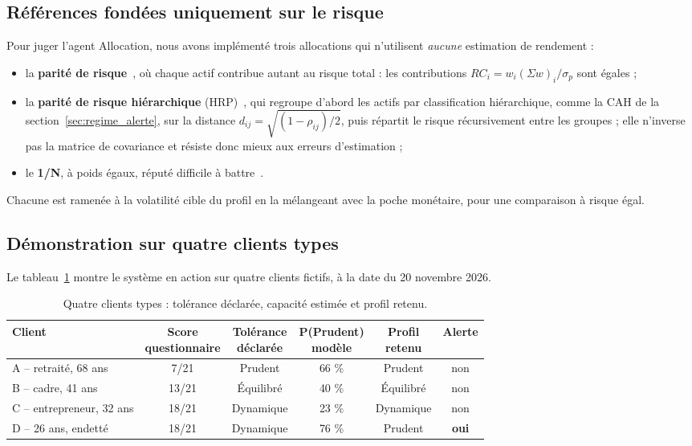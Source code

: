 \subsection{Références fondées uniquement sur le risque}

Pour juger l'agent Allocation, nous avons implémenté trois allocations qui n'utilisent \emph{aucune} estimation de rendement :
\begin{itemize}
  \item la \textbf{parité de risque}~\cite{maillard2010}, où chaque actif contribue autant au risque total : les contributions $RC_i = w_i(\Sigma w)_i/\sigma_p$ sont égales ;
  \item la \textbf{parité de risque hiérarchique} (HRP)~\cite{lopezdeprado2016}, qui regroupe d'abord les actifs par classification hiérarchique, comme la CAH de la section~\ref{sec:regime_alerte}, sur la distance $d_{ij} = \sqrt{(1-\rho_{ij})/2}$, puis répartit le risque récursivement entre les groupes ; elle n'inverse pas la matrice de covariance et résiste donc mieux aux erreurs d'estimation ;
  \item le \textbf{1/N}, à poids égaux, réputé difficile à battre~\cite{demiguel2009}.
\end{itemize}
Chacune est ramenée à la volatilité cible du profil en la mélangeant avec la poche monétaire, pour une comparaison à risque égal.

\subsection{Démonstration sur quatre clients types}

Le tableau~\ref{tab:clients} montre le système en action sur quatre clients fictifs, à la date du 20 novembre 2026.

\begin{table}[!htb]
  \centering
  \small
  \caption{Quatre clients types : tolérance déclarée, capacité estimée et profil retenu.}
  \label{tab:clients}
  \begin{tabular}{@{}l c c c c c@{}}
    \toprule
    \textbf{Client} & \shortstack{\textbf{Score}\\\textbf{questionnaire}} & \shortstack{\textbf{Tolérance}\\\textbf{déclarée}} & \shortstack{\textbf{P(Prudent)}\\\textbf{modèle}} & \shortstack{\textbf{Profil}\\\textbf{retenu}} & \textbf{Alerte} \\
    \midrule
    A -- retraité, 68 ans & 7/21 & Prudent & 66 \% & Prudent & non \\
    B -- cadre, 41 ans & 13/21 & Équilibré & 40 \% & Équilibré & non \\
    C -- entrepreneur, 32 ans & 18/21 & Dynamique & 23 \% & Dynamique & non \\
    D -- 26 ans, endetté & 18/21 & Dynamique & 76 \% & Prudent & \textbf{oui} \\
    \bottomrule
  \end{tabular}
\end{table}

